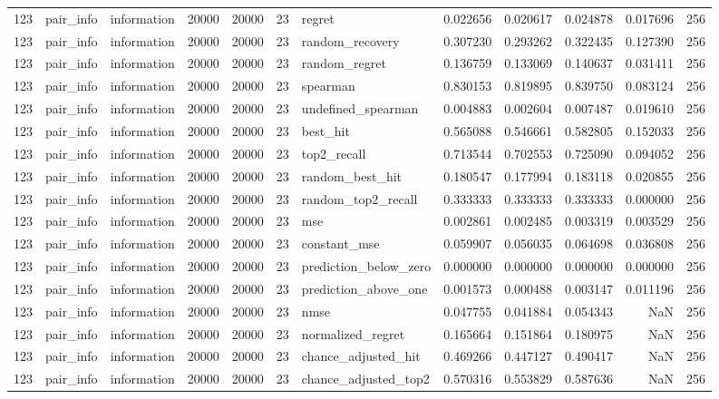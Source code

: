 \begin{tabular}{rllrrrlrrrrr}
123 & pair_info & information & 20000 & 20000 & 23 & regret & 0.022656 & 0.020617 & 0.024878 & 0.017696 & 256 \\
123 & pair_info & information & 20000 & 20000 & 23 & random_recovery & 0.307230 & 0.293262 & 0.322435 & 0.127390 & 256 \\
123 & pair_info & information & 20000 & 20000 & 23 & random_regret & 0.136759 & 0.133069 & 0.140637 & 0.031411 & 256 \\
123 & pair_info & information & 20000 & 20000 & 23 & spearman & 0.830153 & 0.819895 & 0.839750 & 0.083124 & 256 \\
123 & pair_info & information & 20000 & 20000 & 23 & undefined_spearman & 0.004883 & 0.002604 & 0.007487 & 0.019610 & 256 \\
123 & pair_info & information & 20000 & 20000 & 23 & best_hit & 0.565088 & 0.546661 & 0.582805 & 0.152033 & 256 \\
123 & pair_info & information & 20000 & 20000 & 23 & top2_recall & 0.713544 & 0.702553 & 0.725090 & 0.094052 & 256 \\
123 & pair_info & information & 20000 & 20000 & 23 & random_best_hit & 0.180547 & 0.177994 & 0.183118 & 0.020855 & 256 \\
123 & pair_info & information & 20000 & 20000 & 23 & random_top2_recall & 0.333333 & 0.333333 & 0.333333 & 0.000000 & 256 \\
123 & pair_info & information & 20000 & 20000 & 23 & mse & 0.002861 & 0.002485 & 0.003319 & 0.003529 & 256 \\
123 & pair_info & information & 20000 & 20000 & 23 & constant_mse & 0.059907 & 0.056035 & 0.064698 & 0.036808 & 256 \\
123 & pair_info & information & 20000 & 20000 & 23 & prediction_below_zero & 0.000000 & 0.000000 & 0.000000 & 0.000000 & 256 \\
123 & pair_info & information & 20000 & 20000 & 23 & prediction_above_one & 0.001573 & 0.000488 & 0.003147 & 0.011196 & 256 \\
123 & pair_info & information & 20000 & 20000 & 23 & nmse & 0.047755 & 0.041884 & 0.054343 & NaN & 256 \\
123 & pair_info & information & 20000 & 20000 & 23 & normalized_regret & 0.165664 & 0.151864 & 0.180975 & NaN & 256 \\
123 & pair_info & information & 20000 & 20000 & 23 & chance_adjusted_hit & 0.469266 & 0.447127 & 0.490417 & NaN & 256 \\
123 & pair_info & information & 20000 & 20000 & 23 & chance_adjusted_top2 & 0.570316 & 0.553829 & 0.587636 & NaN & 256 \\

\end{tabular}
